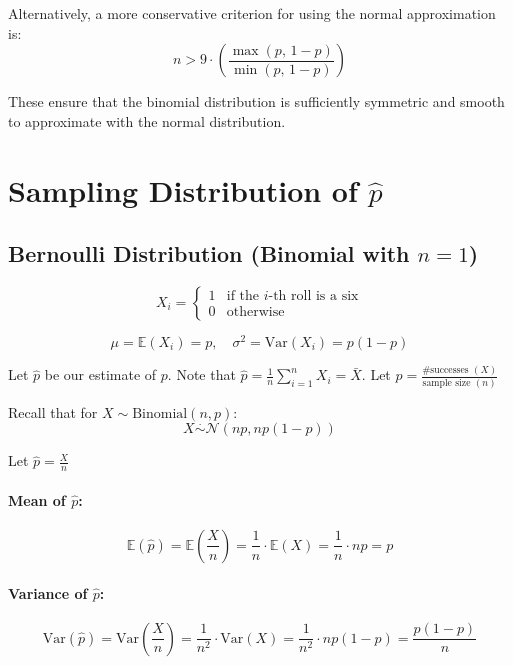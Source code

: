 \vspace{0.5em}

Alternatively, a more conservative criterion for using the normal approximation is:
\[
n > 9 \cdot \left( \frac{\max(p, \, 1 - p)}{\min(p, \, 1 - p)} \right)
\]

\medskip

These ensure that the binomial distribution is sufficiently symmetric and smooth to approximate with the normal distribution.

\medskip
\section{Sampling Distribution of $\hat{p}$}
\subsection*{Bernoulli Distribution (Binomial with $n = 1$)}

\[
X_i =
\begin{cases}
1 & \text{if the $i$-th roll is a six} \\
0 & \text{otherwise}
\end{cases}
\]

\[
\mu = \mathbb{E}(X_i) = p, \quad \sigma^2 = \mathrm{Var}(X_i) = p(1 - p)
\]

Let $\hat{p}$ be our estimate of $p$. Note that $\hat{p} = \frac{1}{n} \sum_{i=1}^{n} X_i = \bar{X}$.
Let $\hat{p} = \frac{\text{\# successes } (X)}{\text{sample size } (n)}$

Recall that for $X \sim \text{Binomial}(n, p)$:
\[
X \overset{\cdot}{\sim} \mathcal{N}(np, np(1 - p))
\]

Let $\hat{p} = \frac{X}{n}$

\paragraph*{Mean of $\hat{p}$:}

\[
\mathbb{E}(\hat{p}) = \mathbb{E} \left( \frac{X}{n} \right) = \frac{1}{n} \cdot \mathbb{E}(X) = \frac{1}{n} \cdot np = p
\]

\paragraph*{Variance of $\hat{p}$:}

\[
\mathrm{Var}(\hat{p}) = \mathrm{Var} \left( \frac{X}{n} \right) = \frac{1}{n^2} \cdot \mathrm{Var}(X) = \frac{1}{n^2} \cdot np(1 - p) = \frac{p(1 - p)}{n}
\]

